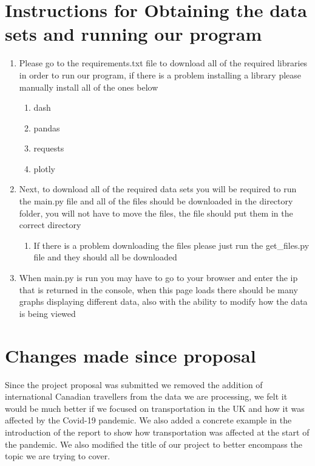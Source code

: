 \documentclass[fontsize=11pt]{article}
\begin{document}
\section*{Instructions for Obtaining the data sets and running our program}
\begin{enumerate}
    \item Please go to the requirements.txt file to download all of the required libraries in order to run our program, if there is a problem installing a library please manually install all of the ones below
    \begin{enumerate}
        \item dash
        \item pandas
        \item requests
        \item plotly
    \end{enumerate}
    \item Next, to download all of the required data sets you will be required to run the main.py file and all of the files should be downloaded in the directory folder, you will not have to move the files, the file should put them in the correct directory
    \begin{enumerate}
        \item If there is a problem downloading the files please just run the get\_files.py file and they should all be downloaded
    \end{enumerate}
    \item When main.py is run you may have to go to your browser and enter the ip that is returned in the console, when this page loads there should be many graphs displaying different data, also with the ability to modify how the data is being viewed
\end{enumerate}

\section*{Changes made since proposal}
Since the project proposal was submitted we removed the addition of international Canadian travellers from the data we are processing, we felt it would be much better if we focused on transportation in the UK and how it was affected by the Covid-19 pandemic. We also added a concrete example in the introduction of the report to show how transportation was affected at the start of the pandemic. We also modified the title of our project to better encompass the topic we are trying to cover.
\end{document}
